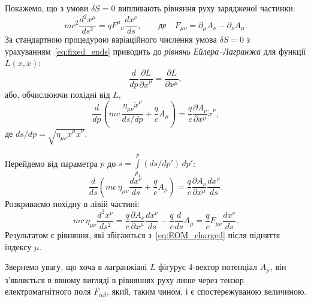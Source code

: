Покажемо, що з умови $\delta S=0$ випливають рівняння руху зарядженої частинки:
\begin{equation}\label{eq:EOM_charged}
    mc^2\frac{d^2x^{\mu}}{ds^2} = qF^{\mu}{}_{\nu}\frac{dx^{\nu}}{ds},
    \qquad\text{де}\quad
    F_{\mu\nu} = \partial_{\mu}A_{\nu} - \partial_{\nu}A_{\mu}.
\end{equation}
За стандартною процедурою варіаційного числення умова $\delta S=0$ з урахуванням~\eqref{eq:fixed_ends} приводить до \emph{рівнянь Ейлера--Лагранжа} для функції $L(x,\dot{x})$:
\begin{equation*}
    \frac{d}{dp}\frac{\partial L}{\partial \dot{x}^{\mu}}
    = \frac{\partial L}{\partial x^{\mu}},
\end{equation*}
або, обчислюючи похідні від $L$,
\begin{equation*}
    \frac{d}{dp}\!\left(mc\,\frac{\eta_{\mu\nu}\dot{x}^{\nu}}{ds/dp}
    + \frac{q}{c}A_{\mu}\right)
    = \frac{q}{c}\frac{\partial A_{\nu}}{\partial x^{\mu}}\dot{x}^{\nu},
\end{equation*}
де $ds/dp = \sqrt{\eta_{\mu\nu}\dot{x}^{\mu}\dot{x}^{\nu}}$.

Перейдемо від параметра $p$ до $s=\int\limits_{p_1}^{p}(ds/dp')\,dp'$:
\begin{equation*}
    \frac{d}{ds}\!\left(mc\,\eta_{\mu\nu}\frac{dx^{\nu}}{ds}
    + \frac{q}{c}A_{\mu}\right)
    = \frac{q}{c}\frac{\partial A_{\nu}}{\partial x^{\mu}}\frac{dx^{\nu}}{ds}.
\end{equation*}
Розкриваємо похідну в лівій частині:
\begin{equation*}
    mc\,\eta_{\mu\nu}\frac{d^2x^{\nu}}{ds^2}
    = \frac{q}{c}\frac{\partial A_{\nu}}{\partial x^{\mu}}\frac{dx^{\nu}}{ds}
    - \frac{q}{c}\frac{d}{ds}A_{\mu}
    = \frac{q}{c}F_{\mu\nu}\frac{dx^{\nu}}{ds}.
\end{equation*}
Результатом є рівняння, які збігаються з~\eqref{eq:EOM_charged} після підняття індексу $\mu$.

Звернемо увагу, що хоча в лагранжіані $L$ фігурує 4-вектор потенціал $A_{\mu}$, він з'являється в явному вигляді в рівняннях руху лише через тензор електромагнітного поля $F_{\alpha\beta}$, який, таким чином, і є спостережуваною величиною.

